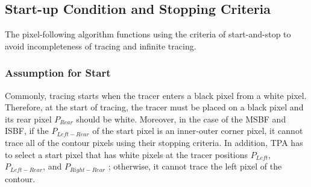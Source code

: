 \subsection{Start-up Condition and Stopping Criteria}

The pixel-following algorithm functions using the criteria of start-and-stop to avoid incompleteness of tracing and infinite tracing.

\subsubsection{Assumption for Start}


Commonly, tracing starts when the tracer enters a black pixel from a white pixel. Therefore, at the start of tracing, the tracer must be placed on a black pixel and its rear pixel $P_{Rear}$ should be white. Moreover, in the case of the MSBF and ISBF, if the $P_{Left-Rear}$ of the start pixel is an inner-outer corner pixel, it cannot trace all of the contour pixels using their stopping criteria\cite{Reddy2012Evaluation,Cheong2012Advanced}. In addition, TPA has to select a start pixel that has white pixels at the tracer positions $P_{Left}$, $P_{Left-Rear}$, and $P_{Right-Rear}$ \cite{Ghuneim2015Contour}; otherwise, it cannot trace the left pixel of the contour. 


